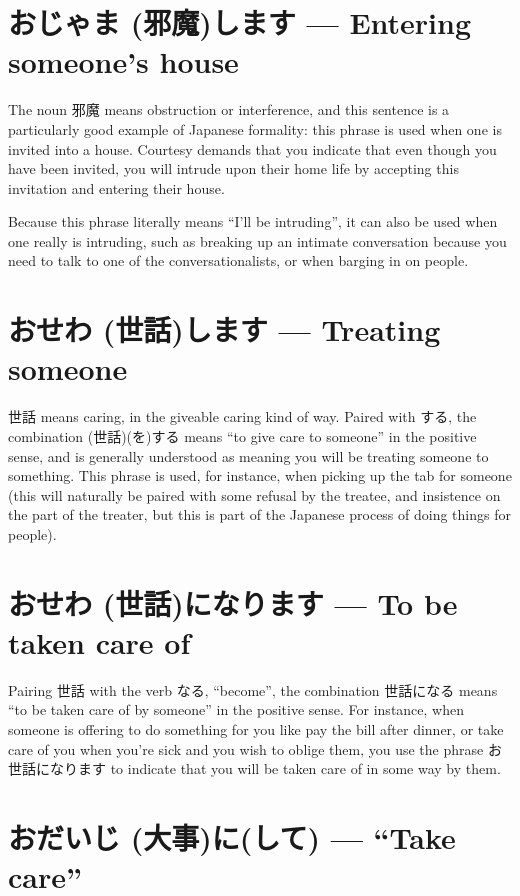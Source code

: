 \documentclass[11pt, b5paper, twoside, openright, onecolumn]{book}
\makeatletter
\newcommand*{\rubystack}[2]{{\relscale{0.5}%
  \begin{tabular}[b]{@{}c@{}}%
    {#1}\\%
   {\textscale{2}{#2}}%
  \end{tabular}}%
}
\DeclareRobustCommand*{\ruby}[2]{%
  \mbox{%
    \setlength{\parskip}{0ex}%
    \BeginAccSupp{method=pdfstringdef,ActualText={#1}}%
      \rubystack{\phantom{#2}}{#1}%
      \llap{%
        \rubystack{#2}{\phantom{#1}}%
      }%
    \EndAccSupp{}%
  }%
}
\renewcommand*{\ruby}[2]{#2 (#1)}%
\makeatother
\begin{document}
\section*{お\ruby{邪魔}{じゃま}します — Entering someone’s house}

The noun 邪魔 means obstruction or interference‚ and this sentence is a particularly good example of Japanese formality: this phrase is used when one is invited into a house. Courtesy demands that you indicate that even though you have been invited‚ you will intrude upon their home life by accepting this invitation and entering their house.

Because this phrase literally means “I’ll be intruding”‚ it can also be used when one really is intruding‚ such as breaking up an intimate conversation because you need to talk to one of the conversationalists‚ or when barging in on people.

\section*{お\ruby{世話}{せわ}します — Treating someone}

世話 means caring‚ in the giveable caring kind of way. Paired with する‚ the combination \ruby{世話}{}(を)する means “to give care to someone” in the positive sense‚ and is generally understood as meaning you will be treating someone to something. This phrase is used‚ for instance‚ when picking up the tab for someone (this will naturally be paired with some refusal by the treatee‚ and insistence on the part of the treater‚ but this is part of the Japanese process of doing things for people).

\section*{お\ruby{世話}{せわ}になります — To be taken care of}

Pairing 世話 with the verb なる‚ “become”‚ the combination 世話になる means “to be taken care of by someone” in the positive sense. For instance‚ when someone is offering to do something for you like pay the bill after dinner‚ or take care of you when you’re sick and you wish to oblige them‚ you use the phrase お世話になります to indicate that you will be taken care of in some way by them.

\section*{お\ruby{大事}{だいじ}に(して) — “Take care”}
\end{document}
